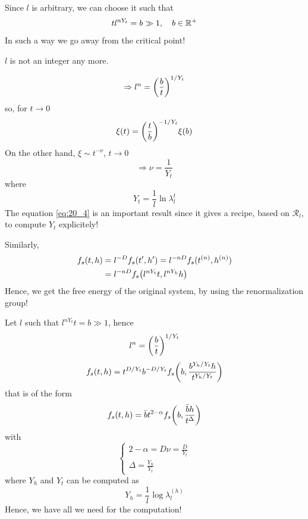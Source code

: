 \documentclass[../main/main.tex]{subfiles}
\begin{document}
Since \( l \) is arbitrary, we can choose it such that
\begin{equation}
  t l ^{n Y_t} = b \gg 1, \quad b \in \mathbb{R}^+
\end{equation}
In such a way we go away from the critical point!
\begin{remark}
\( l \) is not an integer any more.
\end{remark}
\begin{equation}
  \Rightarrow l^n = \qty(\frac{b}{t})^{1/Y_t}
\end{equation}
so, for \( t \rightarrow 0 \)
\begin{equation}
  \xi (t) = \qty(\frac{t}{b})^{-1/Y_t} \xi (b)
\end{equation}
On the other hand, \( \xi \sim t^{-\nu } \), \( t \rightarrow 0 \)
\begin{equation}
  \Rightarrow \nu = \frac{1}{Y_t}
\end{equation}
where
\begin{equation}
  Y_t  = \frac{1}{l} \ln{\lambda _l^t}
  \label{eq:20_4}
\end{equation}
The equation \eqref{eq:20_4} is an important result since it gives a recipe, based on \( \mathcal{R}_l \), to compute \( Y_t \) explicitely!

Similarly,
\begin{equation}
\begin{split}
f_s (t,h)  &= l^{-D} f_s (t',h') = l^{-nD} f_s (t^{(n)},h^{(n)}) \\
& = l^{-nD} f_s \qty(l^{n Y_t}t, l^{n Y_h}h)
\end{split}
\end{equation}
Hence, we get the free energy of the original system, by using the renormalization group!

Let \( l \) such that \( l^{n Y_t} t= b \gg 1\), hence
\begin{equation}
  l^n = \qty(\frac{b}{t})^{1/Y_t}
\end{equation}
\begin{equation}
  f_s (t,h) = t^{D/Y_t} b^{-D/Y_t} f_s \qty(b, \frac{b^{Y_h/Y_t}h}{t^{Y_h/Y_t}})
\end{equation}
that is of the form
\begin{equation}
  f_s (t,h) = \bar{b} t^{2- \alpha } f_s \qty(b, \frac{\bar{b} h}{t^{\Delta }})
\end{equation}
with
\begin{equation}
  \begin{cases}
   2 - \alpha = D \nu = \frac{D}{Y_t}\\
   \Delta = \frac{Y_h}{Y_t}
  \end{cases}
\end{equation}
where \( Y_h \) and \( Y_t \) can be computed as 
\begin{equation}
  Y_h = \frac{1}{l} \log{\lambda _l^{(h)}}
\end{equation}
Hence, we have all we need for the computation!
\end{document}
